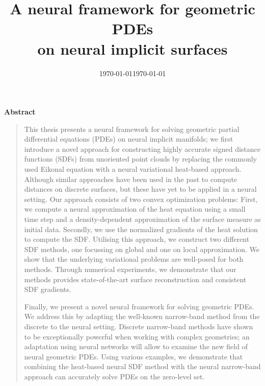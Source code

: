 \documentclass[draft,12pt,openany]{book}
\date{\today}
\title{A neural framework for geometric PDEs\\on neural implicit surfaces}
\date{\today}
\theoremstyle{plainnormal}
\newenvironment{abstract}{
  \cleardoublepage
  \null\vfill
  \begin{center}\bfseries Abstract\end{center}
  \begin{quote}
}{
  \end{quote}
  \vfill\null
  \cleardoublepage
}
\theoremstyle{remark}
\begin{document}
\pagestyle{empty}

\maketitle

\pagestyle{headings}
\setcounter{page}{5}

\begingroup
\let\clearpage\relax

\begin{abstract}
This thesis presents a neural framework for solving geometric partial differential equations (PDEs) on neural implicit manifolds; we first introduce a novel approach for constructing highly accurate signed distance functions (SDFs) from unoriented point clouds by replacing the commonly used Eikonal equation with a neural variational heat-based approach. Although similar approaches have been used in the past to compute distances on discrete surfaces, but these have yet to be applied in a neural setting. Our approach consists of two convex optimization problems: First, we compute a neural approximation of the heat equation using a small time step and a density-dependent approximation of the surface measure as initial data. Secondly, we use the normalized gradients of the heat solution to compute the SDF. Utilising this approach, we construct two different SDF methods, one focussing on global and one on local approximation. We show that the underlying variational problems are well-posed for both methods.
Through numerical experiments, we demonstrate that our methods provides state-of-the-art surface reconstruction and consistent SDF gradients.\par
Finally, we present a novel neural framework for solving geometric PDEs. We address this by adapting the well-known narrow-band method from the discrete to the neural setting. Discrete narrow-band methods have shown to be exceptionally powerful when working with complex geometries; an adaptation using neural networks will allow to examine the new field of neural geometric PDEs. Using various examples, we demonstrate that combining the heat-based neural SDF method with the neural narrow-band approach can accurately solve PDEs on the zero-level set.
\end{abstract}
\end{document}
